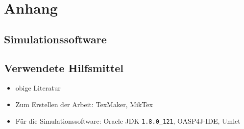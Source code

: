 \section*{Anhang}
\subsection*{Simulationssoftware}
\steffen

\subsection*{Verwendete Hilfsmittel}
\begin{itemize}
	\item obige Literatur
	\item Zum Erstellen der Arbeit: TexMaker, MikTex
	\item Für die Simulationssoftware: Oracle JDK \texttt{1.8.0\_121}, OASP4J-IDE, Umlet
\end{itemize}